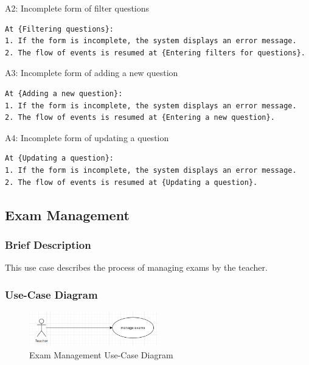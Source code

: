 \documentclass{article}
\begin{document}
\noindent A2: Incomplete form of filter questions
\begin{verbatim}
At {Filtering questions}:
1. If the form is incomplete, the system displays an error message.
2. The flow of events is resumed at {Entering filters for questions}.
\end{verbatim}

\noindent A3: Incomplete form of adding a new question
\begin{verbatim}
At {Adding a new question}:
1. If the form is incomplete, the system displays an error message.
2. The flow of events is resumed at {Entering a new question}.
\end{verbatim}

\noindent A4: Incomplete form of updating a question
\begin{verbatim}
At {Updating a question}:
1. If the form is incomplete, the system displays an error message.
2. The flow of events is resumed at {Updating a question}.
\end{verbatim}

\subsection{Exam Management}
\subsubsection{Brief Description}
This use case describes the process of managing exams by the teacher.
\subsubsection{Use-Case Diagram}
\begin{figure}[h]
    \centering
    \includegraphics[width=0.5\textwidth]{manage_exams.png}
    \caption{Exam Management Use-Case Diagram}
\end{figure}

\end{document}
